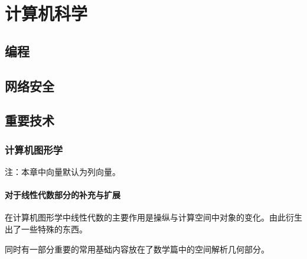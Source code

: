 \documentclass[UTF8]{ctexbook}
\begin{document}
\chapter{计算机科学}{

  \section{编程}{


   }%

  \section{网络安全}{


   }%

  \section{重要技术}{

    \subsection{计算机图形学}{
      注：本章中向量默认为列向量。

      \subsubsection{对于线性代数部分的补充与扩展}{

        在计算机图形学中线性代数的主要作用是操纵与计算空间中对象的变化。由此衍生出了一些特殊的东西。

        同时有一部分重要的常用基础内容放在了数学篇中的空间解析几何部分。

}}}}
\end{document}
